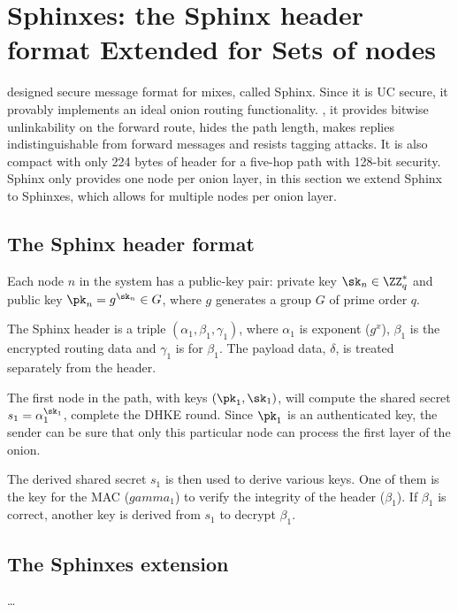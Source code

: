\section{Sphinxes: the Sphinx header format Extended for Sets of nodes}%
\label{Sphinxes}

\Textcite{Sphinx} designed  secure message format for mixes, called 
Sphinx.
Since it is \ac{UC} secure, it provably implements an ideal onion routing 
functionality.
\Ie, it provides bitwise unlinkability on the forward route, hides the path 
length, makes replies indistinguishable from forward messages and resists 
tagging attacks.
It is also compact with only 224 bytes of header for a five-hop path with 
128-bit security.
Sphinx only provides one node per onion layer, in this section we extend Sphinx 
to Sphinxes, which allows for multiple nodes per onion layer.

\subsection{The Sphinx header format}


Each node \(n\) in the system has a public-key pair: private key \(\sk_n\in 
  \ZZ_q^*\) and public key \(\pk_n = g^{\sk_n}\in G\), where \(g\) generates a 
group \(G\) of prime order \(q\).

The Sphinx header is a triple \((\alpha_1, \beta_1, \gamma_1)\), where 
\(\alpha_1\) is  exponent (\(g^x\)), \(\beta_1\) is the encrypted 
routing data and \(\gamma_1\) is  for \(\beta_1\).
The payload data, \(\delta\), is treated separately from the header.

The first node in the path, with keys \((\pk_1, \sk_1)\), will compute the 
shared secret \(s_1 = \alpha_1^{\sk_1}\), \ie complete the \ac{DHKE} round.
Since \(\pk_1\) is an authenticated key, the sender can be sure that only this 
particular node can process the first layer of the onion.

The derived shared secret \(s_1\) is then used to derive various keys.
One of them is the key for the \ac{MAC} (\(gamma_1\)) to verify the integrity 
of the header (\(\beta_1\)).
If \(\beta_1\) is correct, another key is derived from \(s_1\) to decrypt 
\(\beta_1\).

\subsection{The Sphinxes extension}

\dots

